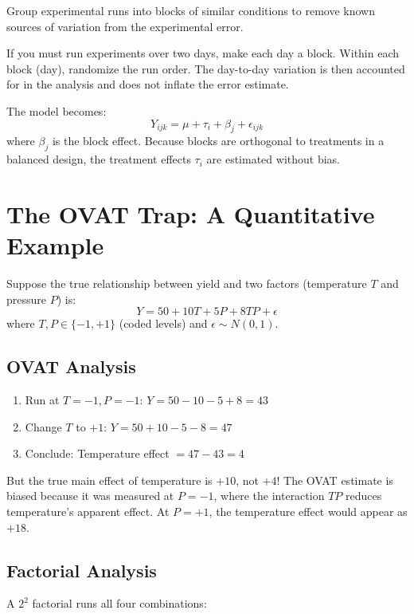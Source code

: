 \documentclass[11pt]{book}
\begin{document}
\begin{keypoint}[Blocking]
Group experimental runs into blocks of similar conditions to remove known sources
of variation from the experimental error.
\end{keypoint}

If you must run experiments over two days, make each day a block. Within each
block (day), randomize the run order. The day-to-day variation is then
accounted for in the analysis and does not inflate the error estimate.

The model becomes:
\[
Y_{ijk} = \mu + \tau_i + \beta_j + \epsilon_{ijk}
\]
where $\beta_j$ is the block effect. Because blocks are orthogonal to
treatments in a balanced design, the treatment effects $\tau_i$ are estimated
without bias.

\section{The OVAT Trap: A Quantitative Example}

Suppose the true relationship between yield and two factors (temperature $T$ and
pressure $P$) is:
\[
Y = 50 + 10T + 5P + 8TP + \epsilon
\]
where $T, P \in \{-1, +1\}$ (coded levels) and $\epsilon \sim N(0, 1)$.

\subsection{OVAT Analysis}

\begin{enumerate}[nosep]
\item Run at $T=-1, P=-1$: $Y = 50 - 10 - 5 + 8 = 43$
\item Change $T$ to $+1$: $Y = 50 + 10 - 5 - 8 = 47$
\item Conclude: Temperature effect $= 47 - 43 = 4$
\end{enumerate}

But the true main effect of temperature is $+10$, not $+4$! The OVAT estimate is
biased because it was measured at $P=-1$, where the interaction $TP$ reduces
temperature's apparent effect. At $P=+1$, the temperature effect would appear as $+18$.

\subsection{Factorial Analysis}

A $2^2$ factorial runs all four combinations:
\end{document}
